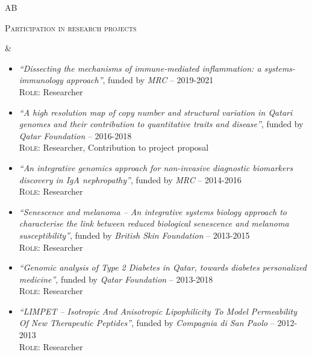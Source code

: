 \documentclass[a4paper,10pt]{article}
\newenvironment{doubletablelist}
{
	\vspace{-0.2cm}
	\begin{longtable}[!h]{AB}}{\end{longtable}
}
\newcommand{\dtlist}[2]{
\hspace{-3cm}
\noindent
	\begin{minipage}{0.24\textwidth}
	\begin{flushright}
	\textsc{#1}
	\end{flushright}
	\end{minipage}
	& #2\\[0.2cm]
}
\newcommand{\minusitem}{\item[-]}
\begin{document}
\begin{doubletablelist}
\dtlist{Participation in research projects}{
	\vspace{-0.8cm}
	\begin{itemize} %
		\minusitem  \begin{minipage}{0.65\textwidth}
			\emph{``Dissecting the mechanisms of immune-mediated inflammation: a systems-immunology approach''}, funded by \emph{MRC} -- 2019-2021\\
			\textsc{Role:} Researcher
		\end{minipage}
		
		\minusitem  \begin{minipage}{0.65\textwidth}
			\emph{``A high resolution map of copy number and structural variation in Qatari genomes and their contribution to quantitative traits and disease''}, funded by \emph{Qatar Foundation} -- 2016-2018\\
			\textsc{Role:} Researcher, Contribution to project proposal
		\end{minipage}
		
		\minusitem  \begin{minipage}{0.65\textwidth}
			\emph{``An integrative genomics approach for non-invasive diagnostic biomarkers discovery in IgA nephropathy''}, funded by \emph{MRC} -- 2014-2016\\
			\textsc{Role:} Researcher
		\end{minipage}
		
		\minusitem  \begin{minipage}{0.65\textwidth}
			\emph{``Senescence and melanoma -- An integrative systems biology approach to characterise the link between reduced biological senescence and melanoma susceptibility''}, funded by \emph{British Skin Foundation} -- 2013-2015\\
			\textsc{Role:} Researcher
		\end{minipage}
			
		\minusitem  \begin{minipage}{0.65\textwidth}
			\emph{``Genomic analysis of Type 2 Diabetes in Qatar, towards diabetes personalized medicine''}, funded by \emph{Qatar Foundation} -- 2013-2018\\
			\textsc{Role:} Researcher
		\end{minipage}
		
		\minusitem  \begin{minipage}{0.65\textwidth}
			\emph{``LIMPET -- Isotropic And Anisotropic Lipophilicity To Model Permeability Of New Therapeutic Peptides''}, funded by \emph{Compagnia di San Paolo} -- 2012-2013\\
			\textsc{Role:} Researcher
		\end{minipage}
	\end{itemize}
}


\end{doubletablelist}
\end{document}
